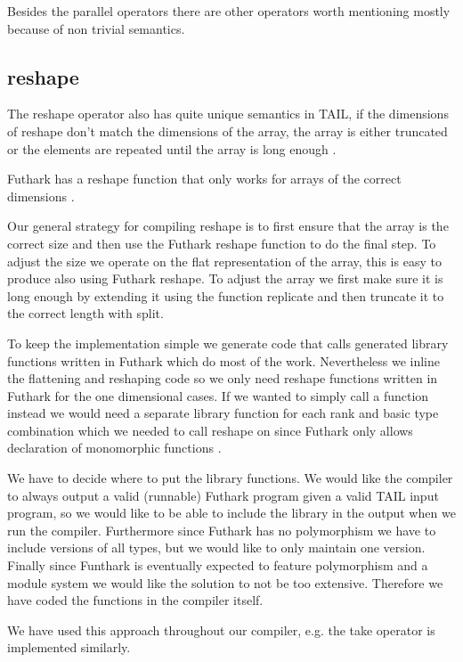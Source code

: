 \documentclass[11pt]{article}
\begin{document}
Besides the parallel operators there are other operators worth mentioning mostly because of non trivial semantics.  

\subsection{reshape}

The reshape operator also has quite unique semantics in TAIL, if the dimensions of reshape don't match the dimensions of the array, the
array is either truncated or the elements are repeated until the array is long enough \cite{ElsmanDybdal:Array:2014}.

Futhark has a reshape function that only works for arrays of the correct dimensions \cite{TroelsHenriksen}.

Our general strategy for compiling reshape is to first ensure that the array is the correct size and then use the Futhark reshape
function to do the final step. To adjust the size we operate on the flat representation of the array, this is easy to produce also
using Futhark reshape. To adjust the array we first make sure it is long enough by extending it using the function replicate and then
truncate it to the correct length with split.

To keep the implementation simple we generate code that calls generated library functions written in Futhark which do most of the work.
Nevertheless we inline the flattening and reshaping code so we only need reshape functions written in Futhark
for the one dimensional cases. If we wanted to simply call a function instead we would need a separate library function for each
rank and basic type combination which we needed to call reshape on since Futhark only allows declaration of monomorphic functions \cite{TroelsHenriksen}.

We have to decide where to put the library functions.
We would like the compiler to always output a valid (runnable) Futhark program given a valid TAIL input program, so we would like to
be able to include the library in the output when we run the compiler.
Furthermore since Futhark has no polymorphism we have to include versions of all types, but we would like to only maintain one version.
Finally since Funthark is eventually expected to feature polymorphism and a module system we would like the solution to not be too
extensive\cite{TroelsHenriksen}. Therefore we have coded the functions in the compiler itself.

We have used this approach throughout our compiler, e.g. the take operator is implemented similarly.
\end{document}
